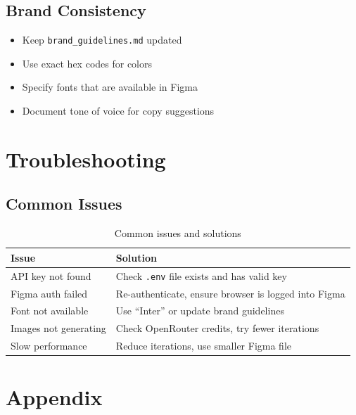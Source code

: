 \documentclass[11pt,a4paper]{article}
\begin{document}
\subsection{Brand Consistency}
\begin{itemize}
    \item Keep \texttt{brand\_guidelines.md} updated
    \item Use exact hex codes for colors
    \item Specify fonts that are available in Figma
    \item Document tone of voice for copy suggestions
\end{itemize}

\section{Troubleshooting}

\subsection{Common Issues}

\begin{table}[h]
\centering
\begin{tabular}{@{}lp{7cm}@{}}
\toprule
\textbf{Issue} & \textbf{Solution} \\
\midrule
API key not found & Check \texttt{.env} file exists and has valid key \\
Figma auth failed & Re-authenticate, ensure browser is logged into Figma \\
Font not available & Use ``Inter'' or update brand guidelines \\
Images not generating & Check OpenRouter credits, try fewer iterations \\
Slow performance & Reduce iterations, use smaller Figma file \\
\bottomrule
\end{tabular}
\caption{Common issues and solutions}
\end{table}

\section{Appendix}
\end{document}
